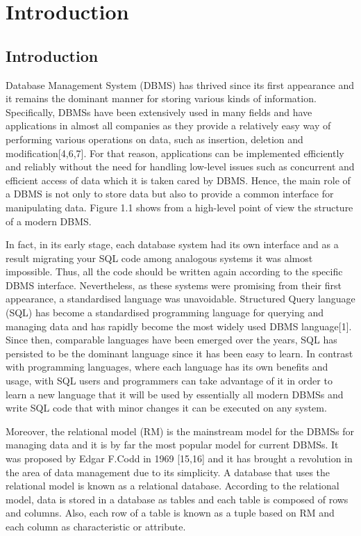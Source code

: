 \chapter{Introduction}
 \section{Introduction}

Database Management System (DBMS) has thrived since its first appearance and it remains the dominant manner for storing various kinds of information. Specifically, DBMSs have been extensively used in many fields and have applications in almost all companies as they provide a relatively easy way of performing various operations on data, such as insertion, deletion and modification[4,6,7]. For that reason, applications can be implemented efficiently and reliably without the need for handling low-level issues such as concurrent and efficient access of data which it is taken cared by DBMS. Hence, the main role of a DBMS is not only to store data but also to provide a common interface for manipulating data. Figure 1.1 shows from a high-level point of view the structure of a modern DBMS.

In fact, in its early stage, each database system had its own interface and as a result migrating your SQL code among analogous systems it was almost impossible. Thus, all the code should be written again according to the specific DBMS interface. Nevertheless, as these systems were promising from their first appearance, a standardised language was unavoidable. Structured Query language (SQL) has become a standardised programming language for querying and managing data and has rapidly become the most widely used DBMS language[1].  Since then, comparable languages have been emerged over the years, SQL has persisted to be the dominant language since it has been easy to learn. In contrast with programming languages, where each language has its own benefits and usage, with SQL users and programmers can take advantage of it in order to learn a new language that it will be used by essentially all modern DBMSs and write SQL code that with minor changes it can be executed on any system\citep{arvin2006comparison}. 

Moreover, the relational model (RM) is the mainstream model for the DBMSs for managing data and it is by far the most popular model for current DBMSs. It was proposed by Edgar F.Codd in 1969 [15,16] and it has brought a revolution in the area of data management due to its simplicity. A database that uses the relational model is known as a relational database. According to the relational model, data is stored in a database as tables and each table is composed of rows and columns. Also, each row of a table is known as a tuple based on RM and each column as characteristic or attribute. 

